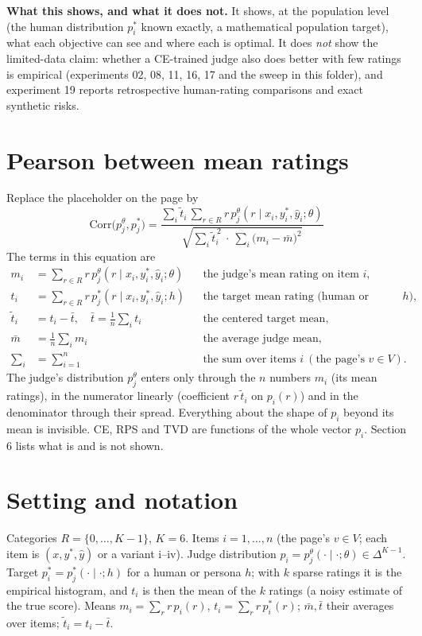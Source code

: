 \documentclass[11pt]{article}
\newcommand{\Pj}{p^{\theta}_{j}}
\newcommand{\Ps}{p^{\ast}_{j}}
\newcommand{\ttil}{\tilde t}
\begin{document}
\textbf{What this shows, and what it does not.} It shows, at the population level (the human distribution $p^\ast_i$ known exactly, a mathematical population target), what each objective can see and where each is optimal. It does \emph{not} show the limited-data claim: whether a CE-trained judge also does better with few ratings is empirical (experiments 02, 08, 11, 16, 17 and the sweep in this folder), and experiment 19 reports retrospective human-rating comparisons and exact synthetic risks.

\section*{Pearson between mean ratings}
Replace the placeholder on the page by
\[
\boxed{\ \mathrm{Corr}\big(\Pj,\Ps\big)=\frac{\sum_{i}\ttil_i\,\sum_{r\in R} r\,\Pj(r\mid x_i,y^\ast_i,\hat y_i;\theta)}{\sqrt{\sum_i \ttil_i^{\,2}\ \cdot\ \sum_i\big(m_i-\bar m\big)^2}}\ }
\]
The terms in this equation are
\begin{align*}
m_i&=\sum_{r\in R} r\,\Pj(r\mid x_i,y^\ast_i,\hat y_i;\theta) &&\text{the judge's mean rating on item } i,\\
t_i&=\sum_{r\in R} r\,\Ps(r\mid x_i,y^\ast_i,\hat y_i;h) &&\text{the target mean rating (human or persona } h),\\
\ttil_i&=t_i-\bar t,\quad \bar t=\tfrac1n\textstyle\sum_i t_i &&\text{the centered target mean},\\
\bar m&=\tfrac1n\textstyle\sum_i m_i &&\text{the average judge mean},\\
\textstyle\sum_i&=\textstyle\sum_{i=1}^{n} &&\text{the sum over items } i \ (\text{the page's } v\in V).
\end{align*}
The judge's distribution $\Pj$ enters only through the $n$ numbers $m_i$ (its mean ratings), in the numerator linearly (coefficient $r\,\ttil_i$ on $p_i(r)$) and in the denominator through their spread. Everything about the shape of $p_i$ beyond its mean is invisible. CE, RPS and TVD are functions of the whole vector $p_i$. Section 6 lists what is and is not shown.

\section{Setting and notation}
Categories $R=\{0,\dots,K-1\}$, $K=6$. Items $i=1,\dots,n$ (the page's $v\in V$; each item is $(x,y^\ast,\hat y)$ or a variant i--iv). Judge distribution $p_i=\Pj(\cdot\mid\cdot;\theta)\in\Delta^{K-1}$. Target $p^\ast_i=\Ps(\cdot\mid\cdot;h)$ for a human or persona $h$; with $k$ sparse ratings it is the empirical histogram, and $t_i$ is then the mean of the $k$ ratings (a noisy estimate of the true score). Means $m_i=\sum_r r\,p_i(r)$, $t_i=\sum_r r\,p^\ast_i(r)$; $\bar m,\bar t$ their averages over items; $\ttil_i=t_i-\bar t$.
\end{document}
